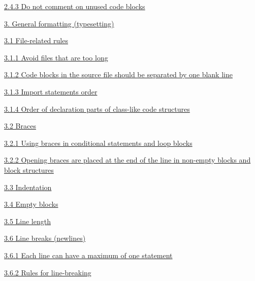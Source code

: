 {{{{{{{{{{{{{{{{\hspace{1.0cm}\hyperref[sec:2.4.3]{ 2.4.3 Do not comment on unused code blocks}

\hspace{1.0cm}\hyperref[sec:]{}

\hspace{0.0cm}\hyperref[sec:3.]{3. General formatting (typesetting)}

\hspace{0.5cm}\hyperref[sec:3.1]{ 3.1 File-related rules}

\hspace{1.0cm}\hyperref[sec:3.1.1]{ 3.1.1 Avoid files that are too long}

\hspace{1.0cm}\hyperref[sec:3.1.2]{ 3.1.2 Code blocks in the source file should be separated by one blank line}

\hspace{1.0cm}\hyperref[sec:3.1.3]{ 3.1.3 Import statements order}

\hspace{1.0cm}\hyperref[sec:3.1.4]{ 3.1.4 Order of declaration parts of class-like code structures}

\hspace{0.5cm}\hyperref[sec:3.2]{ 3.2 Braces}

\hspace{1.0cm}\hyperref[sec:3.2.1]{ 3.2.1 Using braces in conditional statements and loop blocks}

\hspace{1.0cm}\hyperref[sec:3.2.2]{ 3.2.2 Opening braces are placed at the end of the line in non-empty blocks and block structures}

\hspace{0.5cm}\hyperref[sec:3.3]{ 3.3 Indentation}

\hspace{0.5cm}\hyperref[sec:3.4]{ 3.4 Empty blocks}

\hspace{0.5cm}\hyperref[sec:3.5]{ 3.5 Line length}

\hspace{0.5cm}\hyperref[sec:3.6]{ 3.6 Line breaks (newlines)}

\hspace{1.0cm}\hyperref[sec:3.6.1]{ 3.6.1 Each line can have a maximum of one statement}

\hspace{1.0cm}\hyperref[sec:3.6.2]{ 3.6.2 Rules for line-breaking}

}}}}}}}}}}}}}}}}
